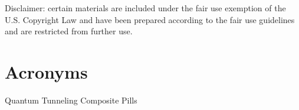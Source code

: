 \begin{frontmatter}
\begin{abstract}
	\end{abstract}
	
	



	
	
	\tableofcontents
	
	\listoftables
	
	\listoffigures
	
	Disclaimer: certain materials are included under the fair use exemption of the U.S. Copyright Law and have been prepared according to the fair use guidelines and are restricted from further use.
	
	\pagebreak
	\section*{Acronyms}
	\begin{acronym}
	 {Quantum Tunneling Composite Pills}
	\end{acronym}
	
	\end{frontmatter}
	
	